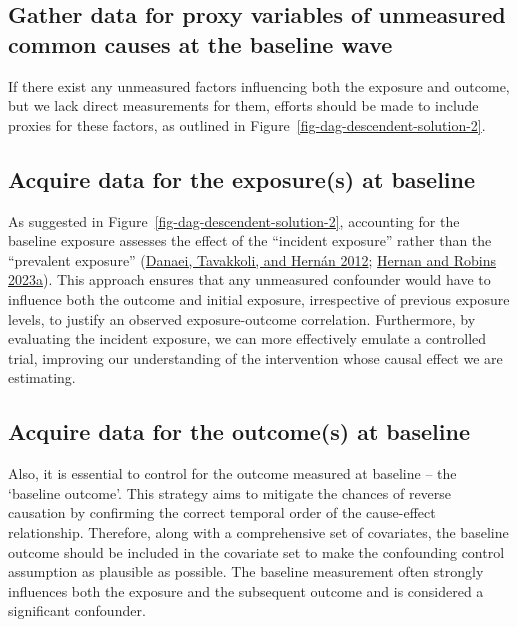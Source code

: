 \documentclass[
  singlecolumn]{report}
\begin{document}
\hypertarget{gather-data-for-proxy-variables-of-unmeasured-common-causes-at-the-baseline-wave}{%
\subsection{\texorpdfstring{\textbf{Gather data for proxy variables of
unmeasured common causes at the baseline
wave}}{Gather data for proxy variables of unmeasured common causes at the baseline wave}}\label{gather-data-for-proxy-variables-of-unmeasured-common-causes-at-the-baseline-wave}}

If there exist any unmeasured factors influencing both the exposure and
outcome, but we lack direct measurements for them, efforts should be
made to include proxies for these factors, as outlined in
Figure~\ref{fig-dag-descendent-solution-2}.

\hypertarget{acquire-data-for-the-exposures-at-baseline}{%
\subsection{\texorpdfstring{\textbf{Acquire data for the exposure(s) at
baseline}}{Acquire data for the exposure(s) at baseline}}\label{acquire-data-for-the-exposures-at-baseline}}

As suggested in Figure~\ref{fig-dag-descendent-solution-2}, accounting
for the baseline exposure assesses the effect of the ``incident
exposure'' rather than the ``prevalent exposure''
(\protect\hyperlink{ref-danaei2012}{Danaei, Tavakkoli, and Hernán 2012};
\protect\hyperlink{ref-hernan2023}{Hernan and Robins 2023a}). This
approach ensures that any unmeasured confounder would have to influence
both the outcome and initial exposure, irrespective of previous exposure
levels, to justify an observed exposure-outcome correlation.
Furthermore, by evaluating the incident exposure, we can more
effectively emulate a controlled trial, improving our understanding of
the intervention whose causal effect we are estimating.

\hypertarget{acquire-data-for-the-outcomes-at-baseline}{%
\subsection{\texorpdfstring{\textbf{Acquire data for the outcome(s) at
baseline}}{Acquire data for the outcome(s) at baseline}}\label{acquire-data-for-the-outcomes-at-baseline}}

Also, it is essential to control for the outcome measured at baseline --
the `baseline outcome'. This strategy aims to mitigate the chances of
reverse causation by confirming the correct temporal order of the
cause-effect relationship. Therefore, along with a comprehensive set of
covariates, the baseline outcome should be included in the covariate set
to make the confounding control assumption as plausible as possible. The
baseline measurement often strongly influences both the exposure and the
subsequent outcome and is considered a significant confounder.
\end{document}
